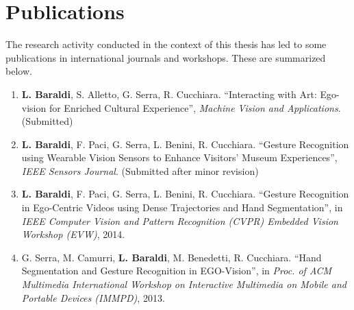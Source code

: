 
\chapter{Publications} %

\label{AppendixA} %


The research activity conducted in the context of this thesis has led to some publications in international journals
and workshops. These are summarized below.

\begin{enumerate}
\item \textbf{L. Baraldi}, S. Alletto, G. Serra, R. Cucchiara. ``Interacting with Art: Ego-vision for Enriched Cultural Experience'', \textit{Machine Vision and Applications}. (Submitted)
\item \textbf{L. Baraldi}, F. Paci, G. Serra, L. Benini, R. Cucchiara. ``Gesture Recognition using Wearable Vision Sensors to Enhance Visitors’ Museum Experiences'', \textit{IEEE Sensors Journal}. (Submitted after minor revision)
\item \textbf{L. Baraldi}, F. Paci, G. Serra, L. Benini, R. Cucchiara. ``Gesture Recognition in Ego-Centric Videos using Dense Trajectories and Hand Segmentation'', in \textit{IEEE Computer Vision and Pattern Recognition (CVPR) Embedded Vision Workshop (EVW)}, 2014.
\item G. Serra, M. Camurri, \textbf{L. Baraldi}, M. Benedetti, R. Cucchiara. ``Hand Segmentation and Gesture Recognition in EGO-Vision'', in \textit{Proc. of ACM Multimedia International Workshop on Interactive Multimedia on Mobile and Portable Devices (IMMPD)}, 2013.
\end{enumerate}

\clearpage
\pagestyle{empty}




